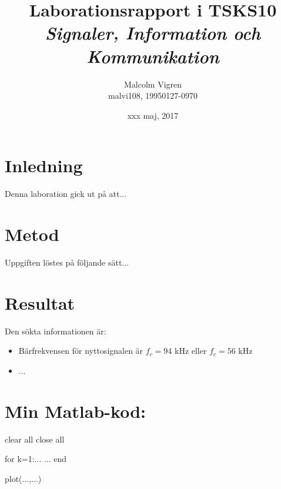 \documentclass[10pt,twocolumn]{article}
\title{Laborationsrapport i TSKS10 \emph{Signaler, Information och Kommunikation}}
\author{Malcolm Vigren \\ malvi108, 19950127-0970 }
\date{xxx maj, 2017}
\begin{document}
\maketitle

\section{Inledning}

Denna laboration gick ut på att...

\section{Metod}

Uppgiften löstes på följande sätt...

\section{Resultat}

Den sökta informationen är:
\begin{itemize}
\item Bärfrekvensen för nyttosignalen är $f_c=94$ kHz eller $f_c=56$ kHz
\item ...
\end{itemize}

\clearpage

\section*{Min Matlab-kod:}
\begin{spverbatim}
clear all
close all

for k=1:...
  ...
end

plot(...,...)
\end{spverbatim}
\end{document}
